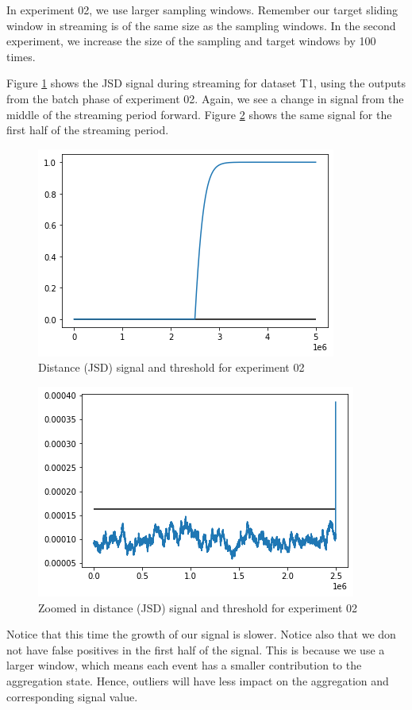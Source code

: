 In experiment 02, we use larger sampling windows. Remember our target sliding window in streaming is of the same size as the sampling windows. In the second experiment, we increase the size of the sampling and target windows by 100 times.

Figure \ref{fig:JSD-signal-02} shows the JSD signal during streaming for dataset T1, using the outputs from the batch phase of experiment 02. Again, we see a change in signal from the middle of the streaming period forward. Figure \ref{fig:JSD-signal-zoom-02} shows the same signal for the first half of the streaming period.
\begin{figure}[!htb]
    \begin{center}
      \includegraphics[scale=0.6]{figures/stream-analysis-viz-62500.png}
      \caption[]{Distance (JSD) signal and threshold for experiment 02}
      \label{fig:JSD-signal-02}
    \end{center}
\end{figure}
\begin{figure}[!htb]
    \begin{center}
      \includegraphics[scale=0.6]{figures/stream-analysis-viz-zoom-62500.png}
      \caption[]{Zoomed in distance (JSD) signal and threshold for experiment 02}
      \label{fig:JSD-signal-zoom-02}
    \end{center}
\end{figure}
Notice that this time the growth of our signal is slower. Notice also that we don not have false positives in the first half of the signal. This is because we use a larger window, which means each event has a smaller contribution to the aggregation state. Hence, outliers will have less impact on the aggregation and corresponding signal value.

